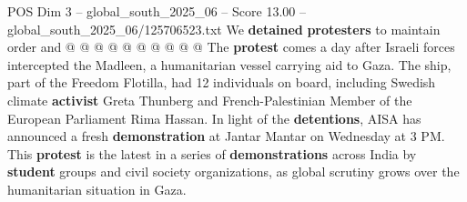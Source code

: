 \begin{textsample}{POS Dim 3 – global\_south\_2025\_06 – Score 13.00 – global\_south\_2025\_06/125706523.txt}
We \textbf{detained} \textbf{protesters} to maintain order and @ @ @ @ @ @ @ @ @ @ The \textbf{protest} comes a day after Israeli forces intercepted the Madleen, a humanitarian vessel carrying aid to Gaza.
The ship, part of the Freedom Flotilla, had 12 individuals on board, including Swedish climate \textbf{activist} Greta Thunberg and French-Palestinian Member of the European Parliament Rima Hassan.
In light of the \textbf{detentions}, AISA has announced a fresh \textbf{demonstration} at Jantar Mantar on Wednesday at 3 PM.
This \textbf{protest} is the latest in a series of \textbf{demonstrations} across India by \textbf{student} groups and civil society organizations, as global scrutiny grows over the humanitarian situation in Gaza.

\end{textsample}
